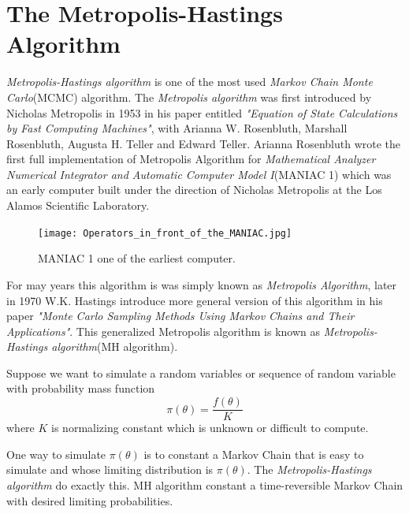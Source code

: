 \section{The Metropolis-Hastings Algorithm}

\textit{Metropolis-Hastings algorithm} is one of the most used \textit{Markov Chain Monte Carlo}(MCMC) algorithm.
The \textit{Metropolis algorithm} was first introduced by Nicholas Metropolis in 1953 in his paper entitled \textit{"Equation of State Calculations by Fast Computing Machines"}, with Arianna W. Rosenbluth, Marshall Rosenbluth, Augusta H. Teller and Edward Teller.
Arianna Rosenbluth wrote the first full implementation of Metropolis Algorithm for  \textit{Mathematical Analyzer Numerical Integrator and Automatic Computer Model I}(MANIAC 1) which was an early computer built under the direction of Nicholas Metropolis at the Los Alamos Scientific Laboratory.

\begin{figure}[H]
	\centering
	\texttt{[image: Operators\_in\_front\_of\_the\_MANIAC.jpg]}
	\caption{MANIAC 1 one of the earliest computer.}
	\label{MANIAC}
\end{figure}

For may years this algorithm is was simply known as \textit{Metropolis Algorithm}, later in 1970 W.K. Hastings introduce more general version of this algorithm in his paper \textit{"Monte Carlo Sampling Methods Using Markov Chains and Their Applications"}. This generalized Metropolis algorithm is known as \textit{Metropolis-Hastings algorithm}(MH algorithm).

Suppose we want to simulate a random variables or sequence of random variable with probability mass function
\begin{equation}
	\pi(\theta) = \frac{f(\theta)}{K}
\end{equation}
where $ K $ is normalizing constant which is unknown or difficult to compute.

One way to simulate $ \pi(\theta) $ is to constant a Markov Chain that is easy to simulate and whose limiting distribution is $ \pi(\theta) $.
The \textit{Metropolis-Hastings algorithm} do exactly this. MH algorithm constant a time-reversible Markov Chain with desired limiting probabilities.

